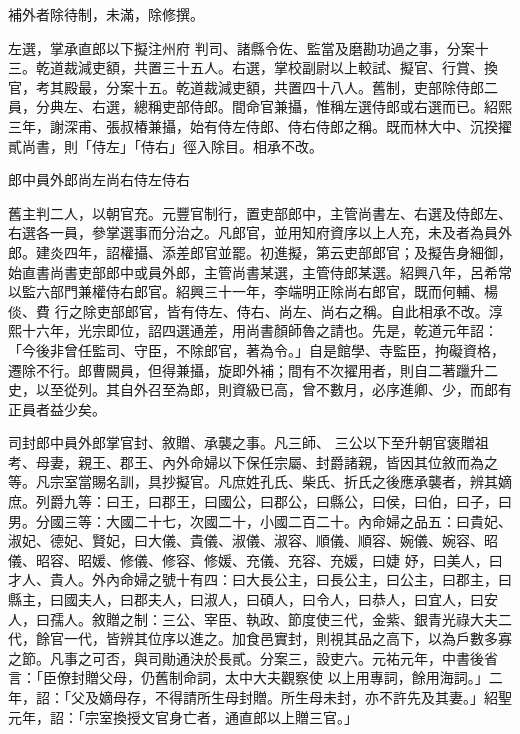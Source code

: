 \begin{pinyinscope}
 補外者除待制，未滿，除修撰。



 左選，掌承直郎以下擬注州府
 判司、諸縣令佐、監當及磨勘功過之事，分案十三。乾道裁減吏額，共置三十五人。右選，掌校副尉以上較試、擬官、行賞、換官，考其殿最，分案十五。乾道裁減吏額，共置四十八人。舊制，吏部除侍郎二員，分典左、右選，總稱吏部侍郎。間命官兼攝，惟稱左選侍郎或右選而已。紹熙三年，謝深甫、張叔椿兼攝，始有侍左侍郎、侍右侍郎之稱。既而林大中、沉揆擢貳尚書，則「侍左」「侍右」徑入除目。相承不改。



 郎中員外郎尚左尚右侍左侍右



 舊主判二人，以朝官充。元豐官制行，置吏部郎中，主管尚書左、右選及侍郎左、右選各一員，參掌選事而分治之。凡郎官，並用知府資序以上人充，未及者為員外郎。建炎四年，詔權攝、添差郎官並罷。初進擬，第云吏部郎官；及擬告身細御，始直書尚書吏部郎中或員外郎，主管尚書某選，主管侍郎某選。紹興八年，呂希常以監六部門兼權侍右郎官。紹興三十一年，李端明正除尚右郎官，既而何輔、楊倓、費
 行之除吏部郎官，皆有侍左、侍右、尚左、尚右之稱。自此相承不改。淳熙十六年，光宗即位，詔四選通差，用尚書顏師魯之請也。先是，乾道元年詔：「今後非曾任監司、守臣，不除郎官，著為令。」自是館學、寺監臣，拘礙資格，遷除不行。郎曹闕員，但得兼攝，旋即外補；間有不次擢用者，則自二著躐升二史，以至從列。其自外召至為郎，則資級已高，曾不數月，必序進卿、少，而郎有正員者益少矣。



 司封郎中員外郎掌官封、敘贈、承襲之事。凡三師、
 三公以下至升朝官褒贈祖考、母妻，親王、郡王、內外命婦以下保任宗屬、封爵諸親，皆因其位敘而為之等。凡宗室當賜名訓，具抄擬官。凡庶姓孔氏、柴氏、折氏之後應承襲者，辨其嫡庶。列爵九等：曰王，曰郡王，曰國公，曰郡公，曰縣公，曰侯，曰伯，曰子，曰男。分國三等：大國二十七，次國二十，小國二百二十。內命婦之品五：曰貴妃、淑妃、德妃、賢妃，曰大儀、貴儀、淑儀、淑容、順儀、順容、婉儀、婉容、昭儀、昭容、昭媛、修儀、修容、修媛、充儀、充容、充媛，曰婕
 妤，曰美人，曰才人、貴人。外內命婦之號十有四：曰大長公主，曰長公主，曰公主，曰郡主，曰縣主，曰國夫人，曰郡夫人，曰淑人，曰碩人，曰令人，曰恭人，曰宜人，曰安人，曰孺人。敘贈之制：三公、宰臣、執政、節度使三代，金紫、銀青光祿大夫二代，餘官一代，皆辨其位序以進之。加食邑實封，則視其品之高下，以為戶數多寡之節。凡事之可否，與司勛通決於長貳。分案三，設吏六。元祐元年，中書後省言：「臣僚封贈父母，仍舊制命詞，太中大夫觀察使
 以上用專詞，餘用海詞。」二年，詔：「父及嫡母存，不得請所生母封贈。所生母未封，亦不許先及其妻。」紹聖元年，詔：「宗室換授文官身亡者，通直郎以上贈三官。」




\end{pinyinscope}
